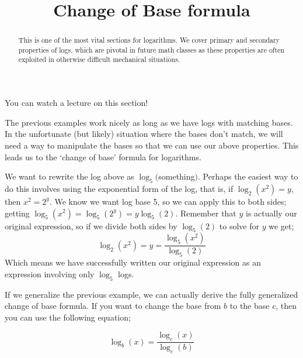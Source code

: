 \documentclass{ximera}
\title{Change of Base formula}
\begin{document}
\begin{abstract}
    This is one of the most vital sections for logarithms. We cover primary and secondary properties of logs, which are pivotal in future math classes as these properties are often exploited in otherwise difficult mechanical situations.
\end{abstract}
\maketitle

You can watch a lecture on this section!


The previous examples work nicely as long as we have logs with matching bases. In the unfortunate (but likely) situation where the bases don't match, we will need a way to manipulate the bases so that we can use our above properties. This leads us to the `change of base' formula for logarithms.

\begin{explanation}%
    We want to rewrite the log above as $\log_5($something$)$. Perhaps the easiest way to do this involves using the exponential form of the log, that is, if $\log_2(x^2) = y$, then $x^2 = 2^y$. We know we want log base 5, so we can apply this to both sides; getting $\log_5(x^2) = \log_5(2^y) = y\log_5(2)$. Remember that $y$ is actually our original expression, so if we divide both sides by $\log_5(2)$ to solve for $y$ we get;
    \[
        \log_2(x^2) = y = \frac{\log_5 \left(x^2\right)}{\log_5(2)}
    \]
    Which means we have successfully written our original expression as an expression involving only $\log_5$ logs.
\end{explanation}%

If we generalize the previous example, we can actually derive the fully generalized change of base formula. If you want to change the base from $b$ to the base $c$, then you can use the following equation;

\[
    \log_b(x) = \frac{\log_c(x)}{\log_c(b)}
\]

%    
%
%
%
%
%
\end{document}
